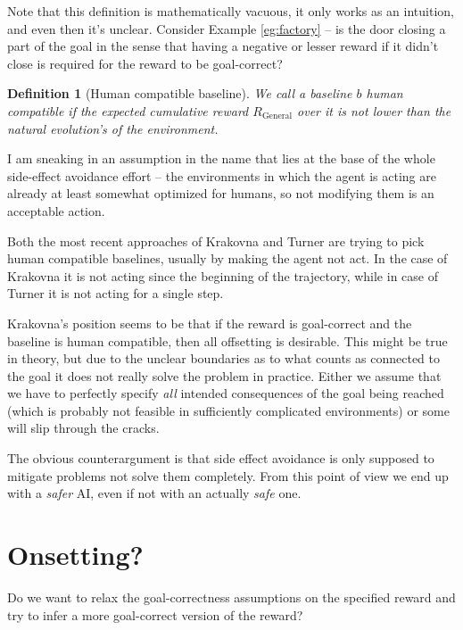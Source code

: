\documentclass{article}
\newtheorem{definition}{Definition}
\newcommand{\rewardFunction}{R}
\newcommand{\generalRewardFunction}{\rewardFunction_{\mathrm{General}}}
\newcommand{\baseline}{b}
\begin{document}
		Note that this definition is mathematically vacuous, it only works as an intuition,
		and even then it's unclear. Consider Example \ref{eg:factory} -- is the door closing
		a part of the goal in the sense that having a negative or lesser reward if it didn't
		close is required for the reward to be goal-correct?

		\begin{definition}[Human compatible baseline]
			We call a baseline $\baseline$ \emph{human compatible} if the expected cumulative reward
			$\generalRewardFunction$ over it is not lower than the natural evolution's of the environment.
			\label{def:humanCompatible}
		\end{definition}

		I am sneaking in an assumption in the name that lies at the base of the whole
		side-effect avoidance effort -- the environments in which the agent is acting are already
		at least somewhat optimized for humans, so not modifying them is an acceptable action.

		Both the most recent approaches of Krakovna and Turner are trying to pick human compatible
		baselines, usually by making the agent not act. In the case of Krakovna it is not acting
		since the beginning of the trajectory, while in case of Turner it is not acting for a single step.

		Krakovna's position seems to be that if the reward is goal-correct and the baseline is
		human compatible, then all offsetting is desirable. This might be true in theory, but
		due to the unclear boundaries as to what counts as connected to the goal it does not
		really solve the problem in practice. Either we assume that we have to perfectly specify
		\emph{all} intended consequences of the goal being reached (which is probably not feasible
		in sufficiently complicated environments) or some will slip through the cracks.

		The obvious counterargument is that side effect avoidance is only supposed to mitigate
		problems not solve them completely. From this point of view we end up with a \emph{safer}
		AI, even if not with an actually \emph{safe} one.
\section{Onsetting?}
 Do we want to relax the goal-correctness assumptions on the specified reward and try to infer
	a more goal-correct version of the reward?
\end{document}
